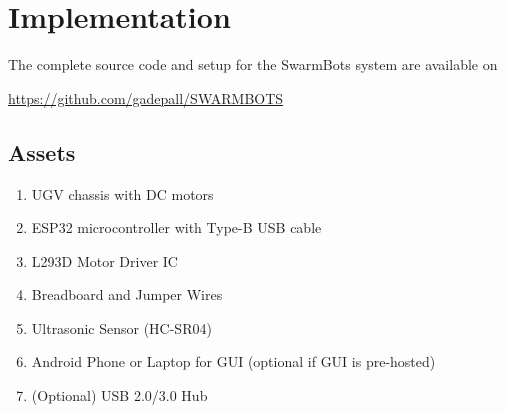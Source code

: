 \documentclass[conference]{IEEEtran}
\begin{document}
\section{Implementation}
\label{sec:Implementation}

The complete source code and setup for the SwarmBots system are available on 
\begin{center}
  \url{https://github.com/gadepall/SWARMBOTS}
\end{center}

\subsection{Assets}
\begin{enumerate}
    \item UGV chassis with DC motors
    \item ESP32 microcontroller with Type-B USB cable
    \item L293D Motor Driver IC
    \item Breadboard and Jumper Wires
    \item Ultrasonic Sensor (HC-SR04)
    \item Android Phone or Laptop for GUI (optional if GUI is pre-hosted)
    \item (Optional) USB 2.0/3.0 Hub
\end{enumerate}
\end{document}
